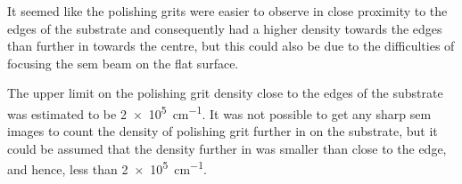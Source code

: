 It seemed like the polishing grits were easier to observe in close proximity to the edges of the substrate and consequently had a higher density towards the edges than further in towards the centre, but this could also be due to the difficulties of focusing the \ac{sem} beam on the flat surface. 

The upper limit on the polishing grit density close to the edges of the substrate was estimated to be \SI{2e5}{\centi\metre^{-1}}. It was not possible to get any sharp \ac{sem} images to count the density of polishing grit further in on the substrate, but it could be assumed that the density further in was smaller than close to the edge, and hence, less than \SI{2e5}{\centi\metre^{-1}}.

\begin{comment}

    \begin{subfigure}[t]{\textwidth}
        \caption{}\label{fig:subAa_large-grit}
          \begin{minipage}[c]{0.43\linewidth}
            \centering
            \texttt{[image: substrateA\_a1\_m016.jpg]}
          \end{minipage}
          \hfill
          \begin{minipage}[c]{0.43\linewidth}
            \centering
            \texttt{[image: eds\_subA\_SiO2.jpg]}
          \end{minipage}
          \begin{minipage}[c]{0.11\linewidth}
            \centering
            \atomicTable[&][&][&]
          \end{minipage}
    \end{subfigure}
    \par\bigskip
\subsubsection{Silicon Carbide (\ce{SiC}) and Silica (SiO2)}
A particle with a diameter of \SI{200}{\nano\metre} is shown in Fig.~\ref{fig:subAa_large-grit} with the corresponding \ac{eds} spectrum. This particle was considerably larger and had a rougher surface than the more frequently observed \SI{50}{\nano\metre} particles that were found to be residual polishing grit. The \ac{eds} spectrum of the particle revealed that the particle consisted of \ce{Si}, \ce{C}, and \ce{O}, which indicated that this particle could be residual \ce{SIO2} polishing grit, \ce{SiC} polishing grit, or an agglomeration of both. \todo{Finn atomprosent for å avgjøre. SiC eller SiO2? Hvor kommer C fra hvis bare SiO2?}
\end{comment}

